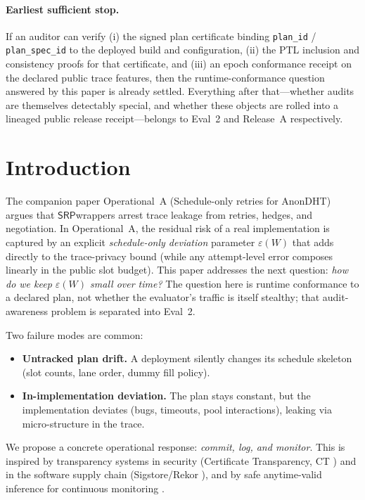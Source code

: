 \documentclass[11pt]{article}
\newcommand{\SRP}{\ensuremath{\mathsf{SRP}}}
\begin{document}
\paragraph{Earliest sufficient stop.}
If an auditor can verify (i) the signed plan certificate binding \texttt{plan\_id} / \texttt{plan\_spec\_id} to the deployed build and configuration,
(ii) the PTL inclusion and consistency proofs for that certificate, and (iii) an epoch conformance receipt on the declared public trace features,
then the runtime-conformance question answered by this paper is already settled.
Everything after that---whether audits are themselves detectably special, and whether these objects are rolled into a lineaged public release receipt---belongs to Eval~2 and Release~A respectively.

\section{Introduction}

The companion paper Operational~A (Schedule-only retries for AnonDHT) argues that \SRP wrappers arrest trace leakage from retries, hedges, and negotiation.\cite{series:operationalA}
In Operational~A, the residual risk of a real implementation is captured by an explicit \emph{schedule-only deviation} parameter $\varepsilon(W)$ that adds directly to the trace-privacy bound (while any attempt-level error composes linearly in the public slot budget).
This paper addresses the next question: \emph{how do we keep $\varepsilon(W)$ small over time?} The question here is runtime conformance to a declared plan, not whether the evaluator's traffic is itself stealthy; that audit-awareness problem is separated into Eval~2.

Two failure modes are common:
\begin{itemize}[leftmargin=*]
  \item \textbf{Untracked plan drift.} A deployment silently changes its schedule skeleton (slot counts, lane order, dummy fill policy).
  \item \textbf{In-implementation deviation.} The plan stays constant, but the implementation deviates (bugs, timeouts, pool interactions),
        leaking via micro-structure in the trace.
\end{itemize}

We propose a concrete operational response: \emph{commit, log, and monitor}.
This is inspired by transparency systems in security (Certificate Transparency, CT \cite{rfc6962,rfc9162})
and in the software supply chain (Sigstore/Rekor \cite{newmanSigstore2022,rekorDocs}),
and by safe anytime-valid inference for continuous monitoring \cite{ramdasSAVIStatSci2023,shaferTestingByBetting,ramdasEvaluesEbook2025,lySAVITutorial2025}.
\end{document}
